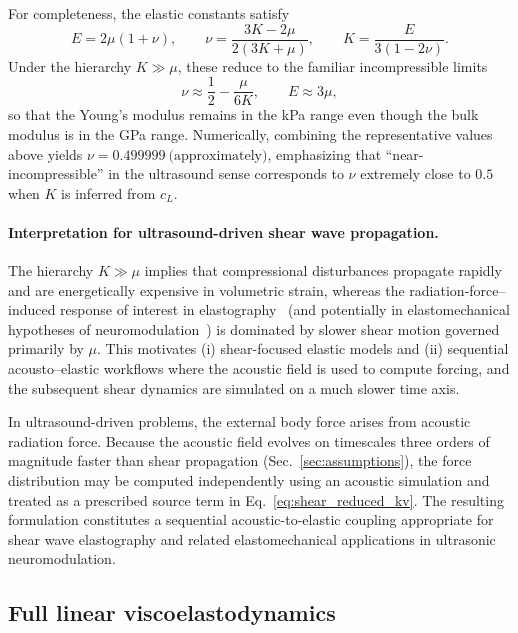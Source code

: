 \documentclass[11pt]{article}
\begin{document}
For completeness, the elastic constants satisfy
\begin{equation}
E = 2\mu(1+\nu), \qquad
\nu = \frac{3K-2\mu}{2(3K+\mu)}, \qquad
K = \frac{E}{3(1-2\nu)}.
\end{equation}
Under the hierarchy $K \gg \mu$, these reduce to the familiar incompressible
limits
\begin{equation}
\nu \approx \frac{1}{2}-\frac{\mu}{6K}, \qquad
E \approx 3\mu,
\end{equation}
so that the Young's modulus remains in the kPa range even though the bulk
modulus is in the GPa range. Numerically, combining the representative values
above yields $\nu = 0.499999\ \text{(approximately)}$, emphasizing that
``near-incompressible'' in the ultrasound sense corresponds to $\nu$ extremely
close to $0.5$ when $K$ is inferred from $c_L$.

\paragraph{Interpretation for ultrasound-driven shear wave propagation.}
The hierarchy $K \gg \mu$ implies that compressional disturbances propagate
rapidly and are energetically expensive in volumetric strain, whereas the
radiation-force–induced response of interest in elastography~\cite{sandrin2003transient,tanter2008quantitative} (and potentially in
elastomechanical hypotheses of neuromodulation~\cite{blackmore2019ultrasound,pinton2012braintherapy}) is dominated by slower shear
motion governed primarily by $\mu$. This motivates (i) shear-focused elastic
models and (ii) sequential acousto--elastic workflows where the acoustic field
is used to compute forcing, and the subsequent shear dynamics are simulated on a
much slower time axis.

In ultrasound-driven problems, the external body force arises from acoustic
radiation force. Because the acoustic field evolves on timescales three orders
of magnitude faster than shear propagation (Sec.~\ref{sec:assumptions}), the
force distribution may be computed independently using an acoustic simulation
and treated as a prescribed source term in Eq.~\eqref{eq:shear_reduced_kv}. The
resulting formulation constitutes a sequential acoustic-to-elastic coupling
appropriate for shear wave elastography and related elastomechanical
applications in ultrasonic neuromodulation.


\subsection{Full linear viscoelastodynamics}
\end{document}

